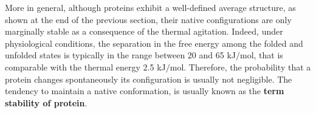 %
%
%


More in general, although proteins exhibit a well-defined average structure, as shown at the end of the previous section, their native configurations are only marginally stable as a consequence of the thermal agitation. Indeed, under physiological conditions, the separation in the free energy among the folded and unfolded states is typically in the range between 20 and 65 kJ$/$mol, that is comparable with the thermal energy 2.5 kJ$/$mol. Therefore, the probability that a protein changes spontaneously its configuration is usually not negligible. 
The tendency to maintain a native conformation, is usually known as the \textbf{term stability of protein}. 


